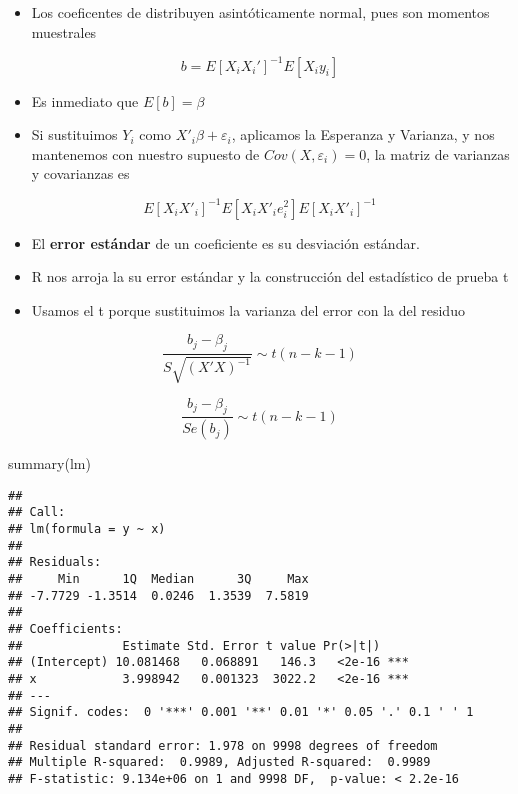 \documentclass[
  ignorenonframetext,
]{beamer}
\newenvironment{Shaded}{\begin{snugshade}}{\end{snugshade}}
\newcommand{\FunctionTok}[1]{\textcolor[rgb]{0.00,0.00,0.00}{#1}}
\newcommand{\NormalTok}[1]{#1}
\providecommand{\tightlist}{%
  \setlength{\itemsep}{0pt}\setlength{\parskip}{0pt}}
\begin{document}
\begin{frame}{}
\protect\hypertarget{section-16}{}
\begin{itemize}
\tightlist
\item
  Los coeficentes de distribuyen asintóticamente normal, pues son
  momentos muestrales
\end{itemize}

\[ b= E[X_iX_i']^{-1} E[X_iy_i]\]

\begin{itemize}
\tightlist
\item
  Es inmediato que \(E[b]=\beta\)
\item
  Si sustituimos \(Y_i\) como \(X'_i\beta+\varepsilon_i\), aplicamos la
  Esperanza y Varianza, y nos mantenemos con nuestro supuesto de
  \(Cov(X,\varepsilon_i)=0\), la matriz de varianzas y covarianzas es
\end{itemize}

\[E[X_iX'_i]^{-1} E[X_i X'_i e_i^2] E[X_iX'_i]^{-1}\]
\end{frame}

\begin{frame}{}
\protect\hypertarget{section-17}{}
\begin{itemize}
\tightlist
\item
  El \textbf{error estándar} de un coeficiente es su desviación
  estándar.
\item
  R nos arroja la su error estándar y la construcción del estadístico de
  prueba t
\item
  Usamos el t porque sustituimos la varianza del error con la del
  residuo
\end{itemize}

\[\frac{b_j-\beta_j}{S \sqrt{(X'X)^{-1}}}\sim t(n-k-1)\]

\[\frac{b_j-\beta_j}{Se(b_j)} \sim t(n-k-1)\]
\end{frame}

\begin{frame}[fragile]{}
\protect\hypertarget{section-18}{}
\begin{Shaded}
\begin{Highlighting}[]
\FunctionTok{summary}\NormalTok{(lm)}
\end{Highlighting}
\end{Shaded}

\begin{verbatim}
## 
## Call:
## lm(formula = y ~ x)
## 
## Residuals:
##     Min      1Q  Median      3Q     Max 
## -7.7729 -1.3514  0.0246  1.3539  7.5819 
## 
## Coefficients:
##              Estimate Std. Error t value Pr(>|t|)    
## (Intercept) 10.081468   0.068891   146.3   <2e-16 ***
## x            3.998942   0.001323  3022.2   <2e-16 ***
## ---
## Signif. codes:  0 '***' 0.001 '**' 0.01 '*' 0.05 '.' 0.1 ' ' 1
## 
## Residual standard error: 1.978 on 9998 degrees of freedom
## Multiple R-squared:  0.9989, Adjusted R-squared:  0.9989 
## F-statistic: 9.134e+06 on 1 and 9998 DF,  p-value: < 2.2e-16
\end{verbatim}
\end{frame}
\end{document}
